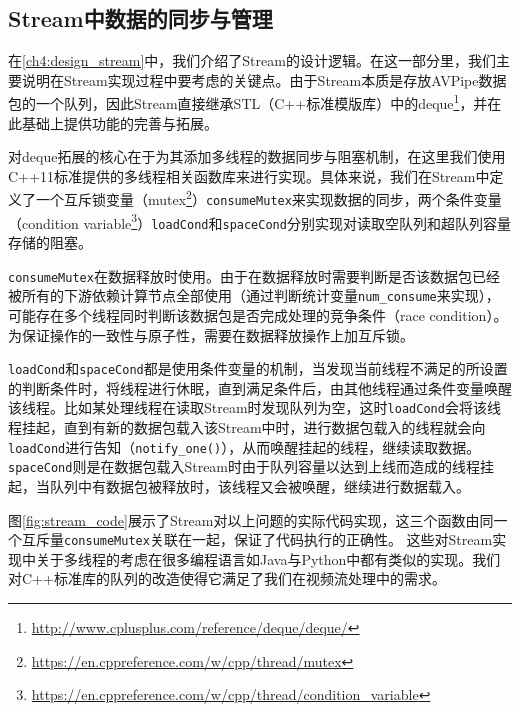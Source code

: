 \subsection{Stream中数据的同步与管理}
在\ref{ch4:design_stream}中，我们介绍了Stream的设计逻辑。在这一部分里，我们主要说明在Stream实现过程中要考虑的关键点。由于Stream本质是存放AVPipe数据包的一个队列，因此Stream直接继承STL（C++标准模版库）中的deque\footnote{\url{http://www.cplusplus.com/reference/deque/deque/}}，并在此基础上提供功能的完善与拓展。\par

对deque拓展的核心在于为其添加多线程的数据同步与阻塞机制，在这里我们使用C++11标准提供的多线程相关函数库来进行实现。具体来说，我们在Stream中定义了一个互斥锁变量（mutex\footnote{\url{https://en.cppreference.com/w/cpp/thread/mutex}}）\texttt{consumeMutex}来实现数据的同步，两个条件变量（condition variable\footnote{\url{https://en.cppreference.com/w/cpp/thread/condition_variable}}）\texttt{loadCond}和\texttt{spaceCond}分别实现对读取空队列和超队列容量存储的阻塞。\par

\texttt{consumeMutex}在数据释放时使用。由于在数据释放时需要判断是否该数据包已经被所有的下游依赖计算节点全部使用（通过判断统计变量\texttt{num\_consume}来实现），可能存在多个线程同时判断该数据包是否完成处理的竞争条件（race condition）。为保证操作的一致性与原子性，需要在数据释放操作上加互斥锁。\par

\texttt{loadCond}和\texttt{spaceCond}都是使用条件变量的机制，当发现当前线程不满足的所设置的判断条件时，将线程进行休眠，直到满足条件后，由其他线程通过条件变量唤醒该线程。比如某处理线程在读取Stream时发现队列为空，这时\texttt{loadCond}会将该线程挂起，直到有新的数据包载入该Stream中时，进行数据包载入的线程就会向\texttt{loadCond}进行告知（\texttt{notify\_one()}），从而唤醒挂起的线程，继续读取数据。\texttt{spaceCond}则是在数据包载入Stream时由于队列容量以达到上线而造成的线程挂起，当队列中有数据包被释放时，该线程又会被唤醒，继续进行数据载入。\par

图\ref{fig:stream_code}展示了Stream对以上问题的实际代码实现，这三个函数由同一个互斥量\texttt{consumeMutex}关联在一起，保证了代码执行的正确性。
这些对Stream实现中关于多线程的考虑在很多编程语言如Java与Python中都有类似的实现。我们对C++标准库的队列的改造使得它满足了我们在视频流处理中的需求。

